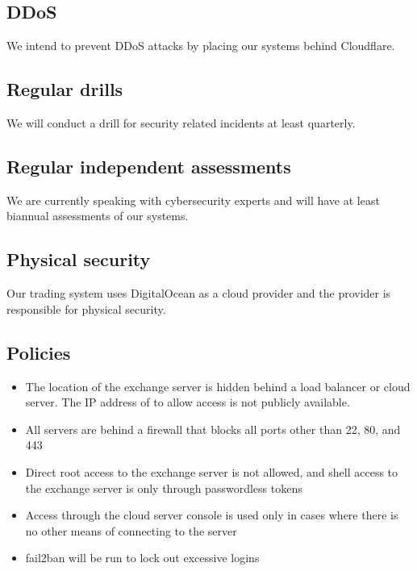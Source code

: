 \subsection{DDoS}
We intend to prevent DDoS attacks by placing our systems behind
Cloudflare.

\subsection{Regular drills}
We will conduct a drill for security related incidents at least quarterly.


\subsection{Regular independent assessments}
We are currently speaking with cybersecurity experts and will have at
least biannual assessments of our systems.


\subsection{Physical security}
Our trading system uses DigitalOcean as a cloud provider and the
provider is responsible for physical security.


\subsection{Policies}
\begin{itemize}
  \item The location of the exchange server is hidden behind a load
  balancer or cloud server.  The IP address of to allow access is not
  publicly available.
  \item All servers are behind a firewall that blocks all ports other
    than 22, 80, and 443
  \item Direct root access to the exchange server is not allowed, and
    shell access to the exchange server is only through passwordless
    tokens
  \item Access through the cloud server console is used only in
    cases where there is no other means of connecting to the server
  \item fail2ban will be run to lock out excessive logins 
\end{itemize}

